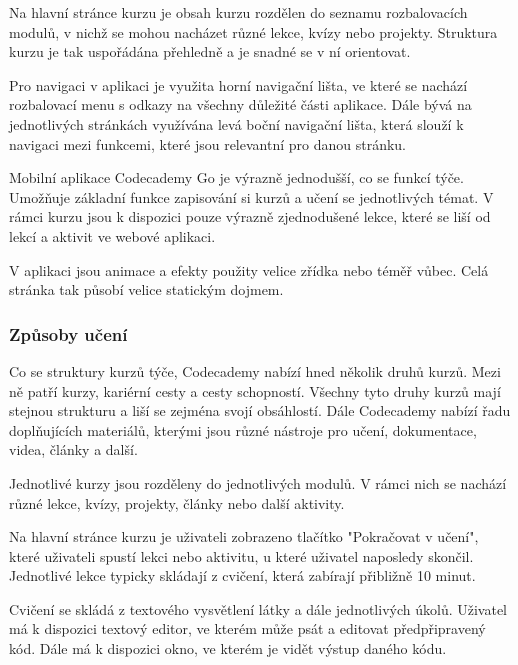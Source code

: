 Na hlavní stránce kurzu je obsah kurzu rozdělen do seznamu rozbalovacích modulů, v nichž se mohou nacházet různé lekce, kvízy nebo projekty. Struktura kurzu je tak uspořádána přehledně a je snadné se v ní orientovat.

Pro navigaci v aplikaci je využita horní navigační lišta, ve které se nachází rozbalovací menu s odkazy na všechny důležité části aplikace. Dále bývá na jednotlivých stránkách využívána levá boční navigační lišta, která slouží k navigaci mezi funkcemi, které jsou relevantní pro danou stránku.

Mobilní aplikace Codecademy Go je výrazně jednodušší, co se funkcí týče. Umožňuje základní funkce zapisování si kurzů a učení se jednotlivých témat. V rámci kurzu jsou k dispozici pouze výrazně zjednodušené lekce, které se liší od lekcí a aktivit ve webové aplikaci. 

V aplikaci jsou animace a efekty použity velice zřídka nebo téměř vůbec. Celá stránka tak působí velice statickým dojmem. 

\subsubsection{Způsoby učení}

Co se struktury kurzů týče, Codecademy nabízí hned několik druhů kurzů. Mezi ně patří kurzy, kariérní cesty a cesty schopností. Všechny tyto druhy kurzů mají stejnou strukturu a liší se zejména svojí obsáhlostí. Dále Codecademy nabízí řadu doplňujících materiálů, kterými jsou různé nástroje pro učení, dokumentace, videa, články a další.

Jednotlivé kurzy jsou rozděleny do jednotlivých modulů. V rámci nich se nachází různé lekce, kvízy, projekty, články nebo další aktivity.

Na hlavní stránce kurzu je uživateli zobrazeno tlačítko "Pokračovat v učení", které uživateli spustí lekci nebo aktivitu, u které uživatel naposledy skončil. Jednotlivé lekce typicky skládají z cvičení, která zabírají přibližně 10 minut.

Cvičení se skládá z textového vysvětlení látky a dále jednotlivých úkolů. Uživatel má k dispozici textový editor, ve kterém může psát a editovat předpřipravený kód. Dále má k dispozici okno, ve kterém je vidět výstup daného kódu.


